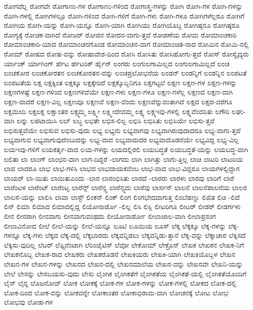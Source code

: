 {ರೋಗವೆಲ್ಲ
ರೋಗವೇ
ರೋಗಾಣು-ಗಳ
ರೋಗಾಣು-ಗಳಿಂದ
ರೋಗಾಸ್ತ್ರ-ಗಳನ್ನು
ರೋಗಿ
ರೋಗಿ-ಗಳ
ರೋಗಿ-ಗಳನ್ನು
ರೋಗಿ-ಗಳಲ್ಲಿ
ರೋಗಿಗಳಲ್ಲೂ
ರೋಗಿ-ಗಳಿಂದ
ರೋಗಿ-ಗಳಿಗೆ
ರೋಗಿ-ಗಳು
ರೋಗಿ-ಗಳೂ
ರೋಗಿಗಳೆಲ್ಲರೂ
ರೋಗಿಗೆ
ರೋಗಿಯ
ರೋಗಿ-ಯನ್ನು
ರೋಗಿ-ಯನ್ನೂ
ರೋಗಿ-ಯಾಗಿ
ರೋಗಿಯು
ರೋಗಿಯೊಬ್ಬ
ರೋಗಿಷ್ಠನೂ
ರೋಗಿಷ್ಠರೂ
ರೋಗ್ಯಕ್ಕೆ
ರೋಚಕ-ವಾಗಿದೆ
ರೋಜರ್
ರೋಜಿನ
ರೋದನ-ವಾಗು-ತ್ತದೆ
ರೋಪಣೆಯ
ರೋಮ
ರೋಮಾಂಚಕಾರಿ
ರೋಮಾಂಚಕಾರಿ-ಯಾದ
ರೋಮಾಂಚನಗೊಂಡ
ರೋಮಾಂಚನ-ವಾಗ
ರೋಮಾಂಚಿತ-ನಾದ
ರೋಮಿನ
ರೋಮಿ-ನಲ್ಲಿ
ರೋಮ್
ರೋಷದ
ರೋಷ-ವನ್ನು
ರೋಷಾವೇಶ-ದಿಂದ
ರೋಸಿ
ರೋಸಿತು
ರೋಸಿಹೋಗು-ತ್ತದೆ
ರೋಸ್
ರೋಸ್ವೈದ್ಯರು
ರ್ಯಾಂಕ್
ರ್ಯಾಗಿಂಗ್
ರ್ಹೆಟ
ರ್ಹೆಟರಿಕ್
ರ್ಹೈನ್
ಲಂಗರು
ಲಂಗುಲಗಾಮಿಲ್ಲದ
ಲಂಗುಲಗಾಮಿಲ್ಲದೆ
ಲಂಚ
ಲಂಚಕೋರ
ಲಂಚಕೋರತನ
ಲಂಚಕೋರತನ-ವನ್ನು
ಲಂಚಪ್ರಲೋಭನೆಯ
ಲಂಡನ್
ಲಂಡನ್ನಿಗೆ
ಲಂಡನ್ನಿನ
ಲಂಪಟತೆ
ಲಂಪಟತೆಯ
ಲಕ್ಷ
ಲಕ್ಷಕ್ಕಿಂತ
ಲಕ್ಷಕ್ಕೂ
ಲಕ್ಷಕ್ಕೇರಿದೆ
ಲಕ್ಷಕ್ಕೊಬ್ಬನಿಗೂ
ಲಕ್ಷಗಟ್ಟಲೆ
ಲಕ್ಷಣ
ಲಕ್ಷಣ-ಗಳ
ಲಕ್ಷಣ-ಗಳನ್ನು
ಲಕ್ಷಣಗಳಷ್ಟೆ
ಲಕ್ಷಣ-ಗಳಿಂದ
ಲಕ್ಷಣಗಳಿವೆಯೇ
ಲಕ್ಷಣ-ಗಳು
ಲಕ್ಷಣ-ಗಳೂ
ಲಕ್ಷಣ-ಗಳೆಲ್ಲ
ಲಕ್ಷಣದ
ಲಕ್ಷಣ-ವಾಗಿ
ಲಕ್ಷಣ-ವಾದರೆ
ಲಕ್ಷಣ-ವಿಲ್ಲ
ಲಕ್ಷಣವೂ
ಲಕ್ಷಣವೆ
ಲಕ್ಷಣ-ವೆಂದು
ಲಕ್ಷಣವೆನ್ನುವಂತಾಗಿದೆ
ಲಕ್ಷದ
ಲಕ್ಷದ-ವರೆಗೂ
ಲಕ್ಷಮಂದಿ
ಲಕ್ಷಲಕ್ಷ
ಲಕ್ಷಾಂತರ
ಲಕ್ಷ್ಮಮ್ಮ
ಲಕ್ಷ್ಮೀ
ಲಕ್ಷ್ಮೀದೇವಮ್ಮ
ಲಕ್ಷ್ಯ
ಲಕ್ಷ್ಯಇವು-ಗಳಲ್ಲಿ
ಲಕ್ಷ್ಯವೆಂದರಿತು
ಲಗೌರಿ
ಲಘು-ವಾಗಿ
ಲನ್ನು
ಲಪಟಾಯಿಸಿ
ಲಬ್
ಲಬ್ಧ
ಲಭತೇ
ಲಭಿಸ-ಲಿಲ್ಲ
ಲಭಿಸಿ
ಲಭಿಸಿತು
ಲಭಿಸಿಯೇ
ಲಭಿಸು-ತ್ತವೆ
ಲಭಿಸುತ್ತವೆಯೇ
ಲಭಿಸುವ
ಲಭಿಸು-ವುದು
ಲಭ್ಯ
ಲಭ್ಯನು
ಲಭ್ಯವಾಗವು
ಲಭ್ಯವಾಗಿರುವುದಾದರೂ
ಲಭ್ಯ-ವಾಗು-ತ್ತದೆ
ಲಭ್ಯವಾಗುವ
ಲಭ್ಯವಾಗುವುದೆಂಬುದನ್ನು
ಲಭ್ಯ-ವಾದ
ಲಭ್ಯವಾದುದರ
ಲಭ್ಯವಾದೊಡನೆಯೇ
ಲಭ್ಯವಿದ್ದ
ಲಭ್ಯ-ವಿಲ್ಲ
ಲಯಇವು-ಗಳಿಗೆ
ಲಯಕರ್ತೃ-ವಾದ
ಲಯ-ಗಳನ್ನು
ಲಯದಲ್ಲಿರಲಿ
ಲಯಬದ್ಧತೆ
ಲಯಬದ್ಧತೆ-ಯನ್ನು
ಲಯಬದ್ಧ-ವಾಗಿ
ಲಲಿತಾ
ಲಾ
ಲಾಂಗ್
ಲಾಂಛನ-ವಾಗಿ
ಲಾಗ-ದಿದ್ದರೆ
-ಲಾಗದು
ಲಾಗಿ
ಲಾಗಿತ್ತು
ಲಾಗು-ತ್ತಿಲ್ಲ
ಲಾಚಿ
ಲಾಟರಿ
ಲಾಟರಿಯ
ಲಾದ
ಲಾದರೂ
ಲಾಭ
ಲಾಭ-ಗಳಿಸಿ
ಲಾಭದ
ಲಾಭದಾಯಕವೆಂಬ
ಲಾಭ-ವಾದ
ಲಾಭ-ವಿದ್ದರೂ
ಲಾಯಗಳಲ್ಲಿದ್ದಾಗ
ಲಾಯರ್
ಲಾ-ಯಿತು
ಲಾಯಿತುಎಂದು
-ಲಾರ
ಲಾರಂಭಿಸಿತು
ಲಾರದೆ
-ಲಾರರು
ಲಾರಳು
ಲಾರವು
ಲಾರಿಗೆ
ಲಾರೆ
ಲಾರೆಂಟಳ
ಲಾರೆಂಟ್
ಲಾರೆಂಟ್ಳ
ಲಾರೆನ್ಸ್
ಲಾರೆನ್ಸ್ನ
ಲಾರೆನ್ಸ್ನದು
ಲಾರೆವು
ಲಾರ್ಸನ್
ಲಾಲನೆ
ಲಾಲನೆಪಾಲನೆಯ
ಲಾಲರ
ಲಾಲಸೆ-ಯನ್ನು
ಲಾಲಿಸಿ
ಲಾವಾ
ಲಾಸ್ಟ್
ಲಿಂಕನ್
ಲಿಂಕ್
ಲಿಂಗ
ಲಿಂಗಭೇದವಾಗುತ್ತ
ಲಿಂಬೆಹಣ್ಣು
ಲಿಖಿತ
ಲಿಚಿ
-ಲಿದೆ
ಲಿನ್
ಲಿಮಾ
ಲಿಮಾದ
ಲಿಮಾದಲ್ಲಿದ್ದ
ಲಿಯೋನಾರ್ಡೊ
-ಲಿಲ್ಲ
ಲಿಸಿ
ಲಿಸ್ಲಿ
ಲೀಟರಿಗೂ
ಲೀಟರ್
ಲೀಡರ್
ಲೀಡರ್ಗಳು
ಲೀನ
ಲೀನರಾಗಿ
ಲೀನವಾಗು
ಲೀನವಾಗುವಂಥದು
ಲೀಯೋನಾರ್ಡೋ
ಲೀಲಾಜಾಲ-ವಾಗಿ
ಲೀಲಾಪ್ರಸಂಗ
ಲೀಲಾವಿನೋದ
ಲೀಲೆ
ಲೀಲೆ-ಯನ್ನು
ಲೀಲೆ-ಯನ್ನೂ
ಲೂಟಿ
ಲೂಯಿಯ
ಲೂಸ್
ಲೆಕ್ಕ
ಲೆಕ್ಕಕ್ಕೂ
ಲೆಕ್ಕ-ಗಳನ್ನು
ಲೆಕ್ಕ-ಗಳನ್ನೂ
ಲೆಕ್ಕ-ಗಳು
ಲೆಕ್ಕದ
ಲೆಕ್ಕ-ದಲ್ಲಿ
ಲೆಕ್ಕಬಾರದು
ಲೆಕ್ಕವನ್ನಿಡಲು
ಲೆಕ್ಕವನ್ನಿಡು-ತ್ತಾನೆ
ಲೆಕ್ಕ-ವನ್ನು
ಲೆಕ್ಕಾಚಾರ
ಲೆಕ್ಕಿಸದೆ
ಲೆಕ್ಕಿಸು-ವುದಿಲ್ಲ
ಲೆಟರ್
ಲೆಫ್ಟಿನೆಂಟಾಗಿ
ಲೆರಿಂಜೈಟಿಸ್
ಲೆವೋ
ಲೇಕೋಮ್
ಲೇಕ್ರೊನ್
ಲೇಖಕ
ಲೇಖಕನ
ಲೇಖಕ-ನಿಗೆ
ಲೇಖಕನೊಬ್ಬ
ಲೇಖಕ-ರಾದ
ಲೇಖಕರು
ಲೇಖಕರೊಡನೆ
ಲೇಖಕಿಯರು
ಲೇಖಕಿ-ಯಾಗಿ
ಲೇಖಕಿಯೊಬ್ಬಳ
ಲೇಖನ
ಲೇಖನ-ಗಳ
ಲೇಖನ-ಗಳನ್ನು
ಲೇಖನದ
ಲೇಖನ-ದಲ್ಲಿ
ಲೇಖನಮಾಲೆಯ
ಲೇಖನ-ವನ್ನು
ಲೇಖನವೇ
ಲೇಖನಿ-ಯನ್ನು
ಲೇಲೆ
ಲೇಸನ್ನು
ಲೇಸಬಯಸು-ವುದು
ಲೇಸು
ಲೈಂಗಿಕ
ಲೈಂಗಿಕತೆಗೆ
ಲೈಂಗಿಕತೆಯ
ಲೈಂಗಿಕತೆ-ಯಲ್ಲಿ
ಲೈಂಗಿಕತೆಯೊಂದಿಗೆ
ಲೈನ್
ಲೈನ್ನ
ಲೊಜನೋವ್
ಲೋಕ
ಲೋಕಕ್ಕೆ
ಲೋಕ-ಗಳ
ಲೋಕ-ಗಳನ್ನು
ಲೋಕ-ಗಳಲ್ಲಿ
ಲೋಕದ
ಲೋಕ-ದಲ್ಲಿ
ಲೋಕ-ದಿಂದ
ಲೋಕ-ವನ್ನು
ಲೋಕವನ್ನೇ
ಲೋಕಾಂತರ
ಲೋಕಾಭಿರಾಮ-ವಾಗಿ
ಲೋಚನಕ್ಕೆ
ಲೋಟ
ಲೋಭ
ಲೋಭವು
ಲೋಹ-ಗಳ
}
